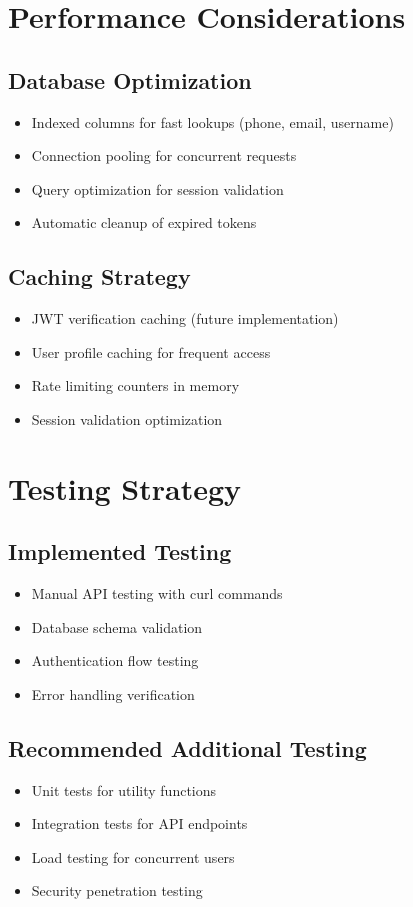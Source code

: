 \documentclass[12pt,a4paper]{article}
\begin{document}
\section{Performance Considerations}

\subsection{Database Optimization}
\begin{itemize}
    \item Indexed columns for fast lookups (phone, email, username)
    \item Connection pooling for concurrent requests
    \item Query optimization for session validation
    \item Automatic cleanup of expired tokens
\end{itemize}

\subsection{Caching Strategy}
\begin{itemize}
    \item JWT verification caching (future implementation)
    \item User profile caching for frequent access
    \item Rate limiting counters in memory
    \item Session validation optimization
\end{itemize}

\section{Testing Strategy}

\subsection{Implemented Testing}
\begin{itemize}
    \item Manual API testing with curl commands
    \item Database schema validation
    \item Authentication flow testing
    \item Error handling verification
\end{itemize}

\subsection{Recommended Additional Testing}
\begin{itemize}
    \item Unit tests for utility functions
    \item Integration tests for API endpoints
    \item Load testing for concurrent users
    \item Security penetration testing
\end{itemize}
\end{document}
